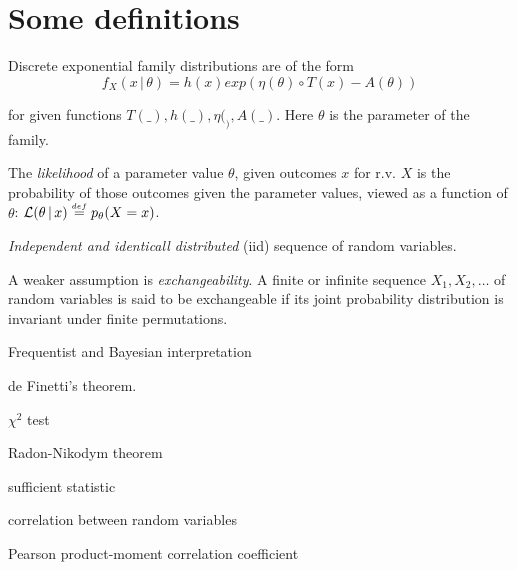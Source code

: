 \documentclass{article}
\newcommand{\alt}{\,|\,}
\newcommand{\defeq}{\stackrel{{\scriptscriptstyle def}}{=}}
\theoremstyle{definition}
\begin{document}



\appendix

\section{Some definitions}

Discrete exponential family distributions are of the form
\[f_X(x \alt \theta) = h(x) exp(\eta(\theta) \circ T(x) - A(\theta))\]

\noindent for given functions \(T(\_), h(\_), \eta(_), A(\_)\). Here \(\theta\) is the parameter of the family.

The {\em likelihood} of a parameter value \(\theta\), given outcomes \(x\) for r.v. \(X\) is the probability of those outcomes given the parameter values, viewed as a function of \(\theta\):
\({\cal L}(\theta \alt x) \defeq p_{\theta}(X=x)\). 

{\em Independent and identicall distributed} (iid) sequence of random variables.

A weaker assumption is {\em exchangeability}. A finite or infinite sequence \(X_1, X_2, \ldots\) of random variables is said to be exchangeable if its joint probability distribution is invariant under finite permutations.

Frequentist and Bayesian interpretation

de Finetti's theorem.


\(\chi^2\) test

Radon-Nikodym theorem

sufficient statistic 

correlation between random variables

Pearson product-moment correlation coefficient
\end{document}
